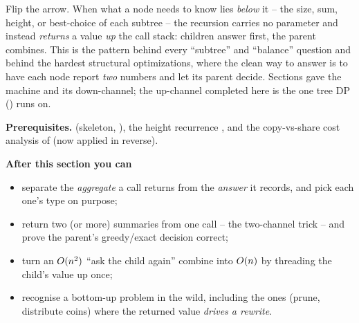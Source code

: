 \begin{topicintro}
Flip the arrow. When what a node needs to know lies \emph{below} it -- the size,
sum, height, or best-choice of each subtree -- the recursion carries no parameter
and instead \emph{returns} a value \emph{up} the call stack: children answer
first, the parent combines. This is the pattern behind every ``subtree'' and
``balance'' question and behind the hardest structural optimizations, where the
clean way to answer is to have each node report \emph{two} numbers and let its
parent decide. Sections  gave the machine and
 its down-channel; the up-channel completed here is the one
tree DP () runs on.

\textbf{Prerequisites.}  (skeleton, ), the height
recurrence , and the copy-vs-share cost analysis of
 (now applied in reverse).

\textbf{After this section you can}
\begin{itemize}[nosep]
  \item separate the \emph{aggregate} a call returns from the \emph{answer} it
        records, and pick each one's type on purpose;
  \item return two (or more) summaries from one call -- the two-channel trick --
        and prove the parent's greedy/exact decision correct;
  \item turn an $O(n^2)$ ``ask the child again'' combine into $O(n)$ by
        threading the child's value up once;
  \item recognise a bottom-up problem in the wild, including the ones (prune,
        distribute coins) where the returned value \emph{drives a rewrite}.
\end{itemize}
\end{topicintro}


